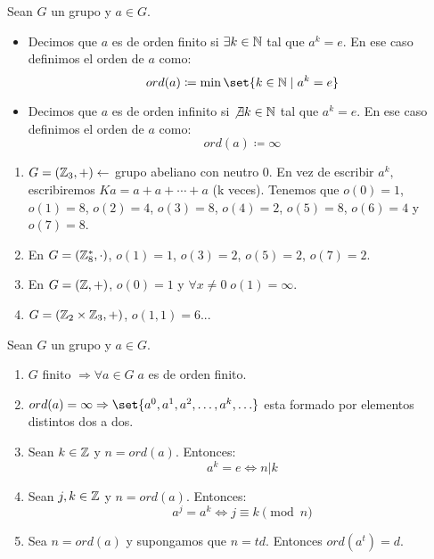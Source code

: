 \begin{definition}
	Sean \(G \) un grupo y \(a \in G \).
	\begin{itemize}
		\item Decimos que \(a \) es de orden finito si \(\exists k \in \mathbb{N} \) tal que \(a^{k}  = e\). En ese caso definimos el orden de \(a \) como:
		      \[
			      ord(a) \coloneqq \min\set{k \in \N \mid a^{k} = e }
		      \]
		\item Decimos que \(a \) es de orden infinito si \(\not\exists k \in \mathbb{N} \) tal que \(a^{k}  = e\). En ese caso definimos el orden de \(a \) como:
		      \[
			      ord(a) \coloneqq \infty
		      \]
	\end{itemize}
\end{definition}
\begin{example}
	\begin{enumerate}
		\item \(G = (\mathbb{Z}_3, + ) \leftarrow\) grupo abeliano con neutro 0. En vez de escribir \(a^{k } ,\) escribiremos \(Ka = a + a + \cdots + a \) (k veces). Tenemos que \(o(0) = 1 \), \(o(1) = 8 \), \(o(2) = 4 \), \(o(3) = 8 \), \(o(4) = 2\), \(o(5) = 8 \), \(o(6) =4 \) y \(o(7) = 8\).
		\item En \(G = (\mathbb{Z}^{*}_8, \cdot )\), \(o(1) = 1\), \(o(3) = 2\), \(o(5) = 2\), \(o(7) = 2\).
		\item En \(G = (\mathbb{Z}, + )\), \(o(0) = 1 \) y \(\forall x \neq 0 \; o(1) = \infty \).
		\item \(G = (\mathbb{Z}_2 \times \mathbb{Z}_3, + )\), \(o(1,1) = 6 \)...
	\end{enumerate}
\end{example}
\begin{proposition}
	\label{orden}
	Sean \(G \) un grupo y \(a \in G \).
	\begin{enumerate}
		\item \(G \) finito \(\Rightarrow \forall a \in G \; a\) es de orden finito.
		\item \(ord(a) = \infty \Rightarrow \set{a^{0}, a^{1}, a^{2}, \ldots, a^{k}, \ldots }\) esta formado por elementos distintos dos a dos.
		\item Sean \(k \in \mathbb{Z} \) y \(n = ord(a )\). Entonces:
		      \[
			      a^{k} = e \iff n|k
		      \]
		\item Sean \(j,k \in \mathbb{Z} \) y \(n = ord(a )\). Entonces:
		      \[
			      a^{j} = a^{k } \iff j \equiv k \pmod n
		      \]
		\item Sea \(n = ord(a )\) y supongamos que \(n = td \). Entonces \(ord(a^{t } ) = d\).
	\end{enumerate}
\end{proposition}
